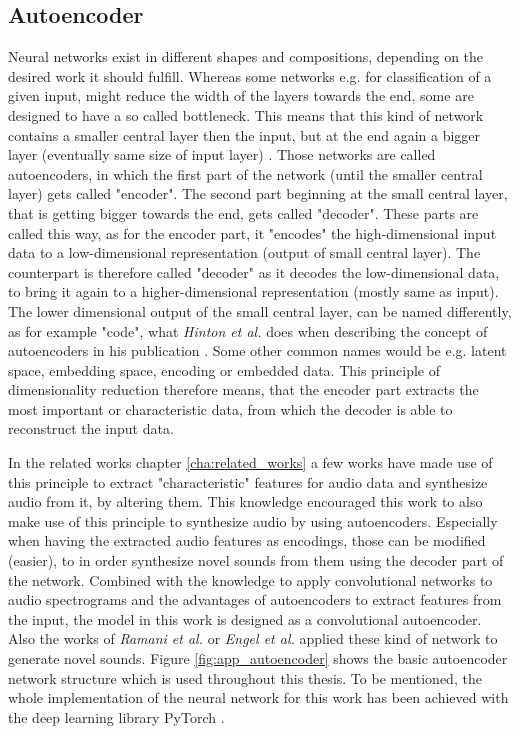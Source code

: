 \subsection{Autoencoder}
Neural networks exist in different shapes and compositions, depending on the desired work it should fulfill. Whereas some networks e.g. for classification of a given input, might reduce the width of the layers towards the end, some are designed to have a so called bottleneck. This means that this kind of network contains a smaller central layer then the input, but at the end again a bigger layer (eventually same size of input layer) \cite{hinton2006autoencoder}. Those networks are called autoencoders, in which the first part of the network (until the smaller central layer) gets called "encoder". The second part beginning at the small central layer, that is getting bigger towards the end, gets called "decoder". These parts are called this way, as for the encoder part, it "encodes" the high-dimensional input data to a low-dimensional representation (output of small central layer). The counterpart is therefore called "decoder" as it decodes the low-dimensional data, to bring it again to a higher-dimensional representation (mostly same as input). The lower dimensional output of the small central layer, can be named differently, as for example "code", what \textit{Hinton et al.} does when describing the concept of autoencoders in his publication \cite{hinton2006autoencoder}. Some other common names would be e.g. latent space, embedding space, encoding or embedded data. This principle of dimensionality reduction therefore means, that the encoder part extracts the most important or characteristic data, from which the decoder is able to reconstruct the input data.

In the related works chapter \ref{cha:related_works} a few works have made use of this principle to extract "characteristic" features for audio data and synthesize audio from it, by altering them. This knowledge encouraged this work to also make use of this principle to synthesize audio by using autoencoders. Especially when having the extracted audio features as encodings, those can be modified (easier), to in order synthesize novel sounds from them using the decoder part of the network. 
Combined with the knowledge to apply convolutional networks to audio spectrograms and the advantages of autoencoders to extract features from the input, the model in this work is designed as a convolutional autoencoder. Also the works of \textit{Ramani et al.} or \textit{Engel et al.} applied these kind of network to generate novel sounds. Figure \ref{fig:app_autoencoder} shows the basic autoencoder network structure which is used throughout this thesis. To be mentioned, the whole implementation of the neural network for this work has been achieved with the deep learning library PyTorch \cite{paszke2019pytorch}.

